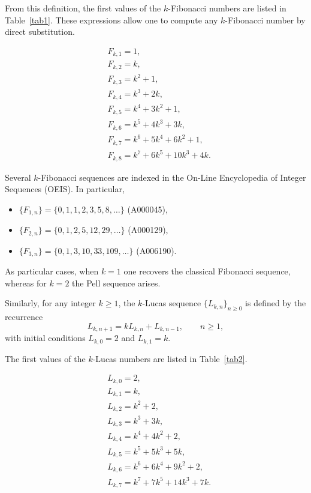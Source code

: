 \documentclass[11pt]{birkjour}
\theoremstyle{definition}
\theoremstyle{remark}
\numberwithin{equation}{section}
\begin{document}
\par\smallskip
\noindent
From this definition, the first values of the $k$-Fibonacci numbers are listed in Table~\ref{tab1}. These expressions allow one to compute any $k$-Fibonacci number by direct substitution.

\begin{table}[ht]
\centering
\[
\begin{aligned}
& F_{k,1} = 1, \\
& F_{k,2} = k, \\
& F_{k,3} = k^2 + 1, \\
& F_{k,4} = k^3 + 2k, \\
& F_{k,5} = k^4 + 3k^2 + 1, \\
& F_{k,6} = k^5 + 4k^3 + 3k, \\
& F_{k,7} = k^6 + 5k^4 + 6k^2 + 1, \\
& F_{k,8} = k^7 + 6k^5 + 10k^3 + 4k.
\end{aligned}
\]
\caption{First values of the $k$-Fibonacci numbers}
\label{tab1}
\end{table}

\noindent
Several $k$-Fibonacci sequences are indexed in the On-Line Encyclopedia of Integer Sequences \cite{OEIS} (OEIS). In particular,
\begin{itemize}
    \item $\{F_{1,n}\}=\{0,1,1,2,3,5,8,\ldots\}$ (A000045),
    \item $\{F_{2,n}\}=\{0,1,2,5,12,29,\ldots\}$ (A000129),
    \item $\{F_{3,n}\}=\{0,1,3,10,33,109,\ldots\}$ (A006190).
\end{itemize}

\noindent
As particular cases, when $k=1$ one recovers the classical Fibonacci sequence, whereas for $k=2$ the Pell sequence arises.

\par\smallskip
\noindent
Similarly, for any integer $k\geq 1$, the $k$-Lucas sequence $\{L_{k,n}\}_{n\geq 0}$ is defined by the recurrence
\[
L_{k,n+1}=kL_{k,n}+L_{k,n-1},\qquad n\geq 1,
\]
with initial conditions $L_{k,0}=2$ and $L_{k,1}=k$.

\par\smallskip
\noindent
The first values of the $k$-Lucas numbers are listed in Table~\ref{tab2}.

\begin{table}[ht]
\centering
\[
\begin{aligned}
& L_{k,0}=2, \\
& L_{k,1}=k, \\
& L_{k,2}=k^2+2, \\
& L_{k,3}=k^3+3k, \\
& L_{k,4}=k^4+4k^2+2, \\
& L_{k,5}=k^5+5k^3+5k, \\
& L_{k,6}=k^6+6k^4+9k^2+2, \\
& L_{k,7}=k^7+7k^5+14k^3+7k.
\end{aligned}
\]
\caption{First values of the $k$-Lucas numbers}
\label{tab2}
\end{table}
\end{document}
